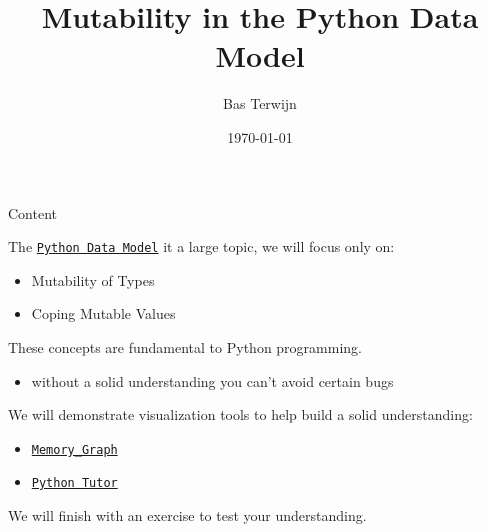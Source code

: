 \documentclass[10pt, colorlinks=true, urlcolor=blue]{beamer}
\title{Mutability in the Python Data Model}
\author{Bas Terwijn}
\date{\today}
\begin{document}
\begin{frame}
    \titlepage
\end{frame}

\begin{frame}{Content}

  The \href{https://docs.python.org/3/reference/datamodel.html}{\texttt{Python Data Model}} it a large topic, we will focus only on:
  \begin{itemize}
  \item Mutability of Types
  \item Coping Mutable Values
  \end{itemize}

  \vspace{2em}
  
  These concepts are fundamental to Python programming.
  \begin{itemize}
    \item without a solid understanding you can't avoid certain bugs
  \end{itemize}

  \vspace{2em}
  
  We will demonstrate visualization tools to help build a solid understanding:
  \begin{itemize}
  \item \href{https://pypi.org/project/memory-graph/}{\texttt{Memory\_Graph}}
  \item \href{https://pythontutor.com/}{\texttt{Python Tutor}}
  \end{itemize}

  \vspace{2em}

  We will finish with an exercise to test your understanding.
  
\end{frame}
\end{document}
